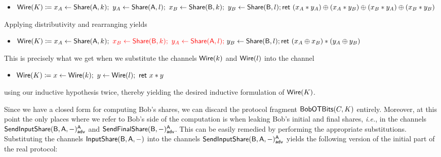 \begin{itemize}
\begin{itemize}
\item $\mathsf{Wire}(K) \coloneqq x_A \leftarrow \mathsf{Share}(\mathsf{A},k); \ y_A \leftarrow \mathsf{Share}(\mathsf{A},l); \ x_B \leftarrow \mathsf{Share}(\mathsf{B},k); \ y_B \leftarrow \mathsf{Share}(\mathsf{B},l); \\ \mathsf{ret} \ (x_A * y_A) \oplus (x_A * y_B) \oplus (x_B * y_A) \oplus (x_B * y_B)$
\end{itemize}
Applying distributivity and rearranging yields
\begin{itemize}
\item $\mathsf{Wire}(K) \coloneqq x_A \leftarrow \mathsf{Share}(\mathsf{A},k); \ {\color{red} x_B \leftarrow \mathsf{Share}(\mathsf{B},k); \ y_A \leftarrow \mathsf{Share}(\mathsf{A},l); \ } y_B \leftarrow \mathsf{Share}(\mathsf{B},l); \\ \mathsf{ret} \ (x_A \oplus x_B) * (y_A \oplus y_B)$
\end{itemize}
This is precisely what we get when we substitute the channels $\mathsf{Wire}(k)$ and $\mathsf{Wire}(l)$ into the channel
\begin{itemize}
\item $\mathsf{Wire}(K) \coloneqq x \leftarrow \mathsf{Wire}(k); \ y \leftarrow \mathsf{Wire}(l); \ \mathsf{ret} \ x * y$
\end{itemize}
using our inductive hypothesis twice, thereby yielding the desired inductive formulation of $\mathsf{Wire}(K)$.
\end{itemize}

\noindent Since we have a closed form for computing Bob's shares, we can discard the protocol fragment $\mathsf{BobOTBits}(C,K)$ entirely. Moreover, at this point the only places where we refer to Bob's side of the computation is when leaking Bob's initial and final shares, \emph{i.e.}, in the channels $\mathsf{SendInputShare}(\mathsf{B},\mathsf{A},-)^{\mathsf{A}}_{\mathsf{adv}}$ and $\mathsf{SendFinalShare}(\mathsf{B},-)^{\mathsf{A}}_{\mathsf{adv}}$. This can be easily remedied by performing the appropriate substitutions. Substituting the channels $\mathsf{InputShare}(\mathsf{B},\mathsf{A},-)$ into the channels $\mathsf{SendInputShare}(\mathsf{B},\mathsf{A},-)^{\mathsf{A}}_{\mathsf{adv}}$ yields the following version of the initial part of the real protocol:

